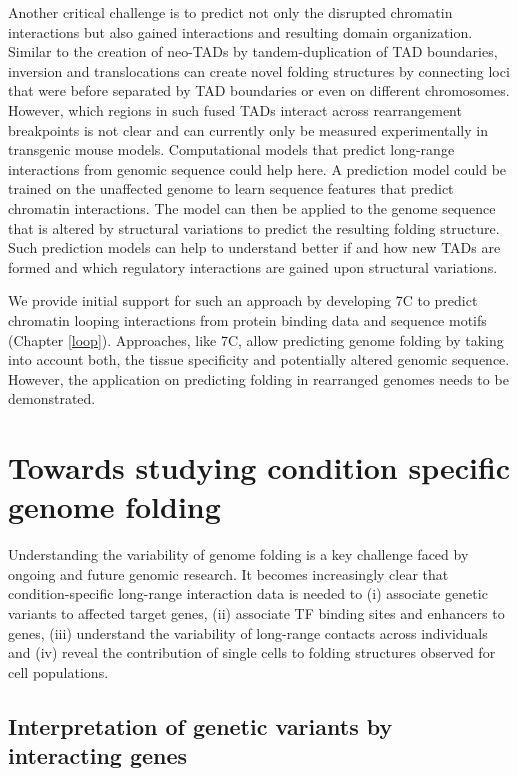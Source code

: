 \documentclass[a4paper,twoside=true,openright,parskip=full,chapterprefix=true,11pt,headings=normal,bibliography=totoc,listof=totoc,titlepage=on,captions=tableabove,draft=false]{scrreprt}
\theoremstyle{definition}
\theoremstyle{definition}
\theoremstyle{definition}
\theoremstyle{remark}
\begin{document}
Another critical challenge is to predict not only the disrupted
chromatin interactions but also gained interactions and resulting domain
organization. Similar to the creation of neo-TADs by tandem-duplication
of TAD boundaries, inversion and translocations can create novel folding
structures by connecting loci that were before separated by TAD
boundaries or even on different chromosomes. However, which regions in
such fused TADs interact across rearrangement breakpoints is not clear
and can currently only be measured experimentally in transgenic mouse
models. Computational models that predict long-range interactions from
genomic sequence could help here. A prediction model could be trained on
the unaffected genome to learn sequence features that predict chromatin
interactions. The model can then be applied to the genome sequence that
is altered by structural variations to predict the resulting folding
structure. Such prediction models can help to understand better if and
how new TADs are formed and which regulatory interactions are gained
upon structural variations.

We provide initial support for such an approach by developing 7C to
predict chromatin looping interactions from protein binding data and
sequence motifs (Chapter \ref{loop}). Approaches, like 7C, allow
predicting genome folding by taking into account both, the tissue
specificity and potentially altered genomic sequence. However, the
application on predicting folding in rearranged genomes needs to be
demonstrated.

\hypertarget{towards-studying-condition-specific-genome-folding}{%
\section{Towards studying condition specific genome
folding}\label{towards-studying-condition-specific-genome-folding}}

Understanding the variability of genome folding is a key challenge faced
by ongoing and future genomic research. It becomes increasingly clear
that condition-specific long-range interaction data is needed to (i)
associate genetic variants to affected target genes, (ii) associate TF
binding sites and enhancers to genes, (iii) understand the variability
of long-range contacts across individuals and (iv) reveal the
contribution of single cells to folding structures observed for cell
populations.

\hypertarget{interpretation-of-genetic-variants-by-interacting-genes}{%
\subsection{Interpretation of genetic variants by interacting
genes}\label{interpretation-of-genetic-variants-by-interacting-genes}}
\end{document}
